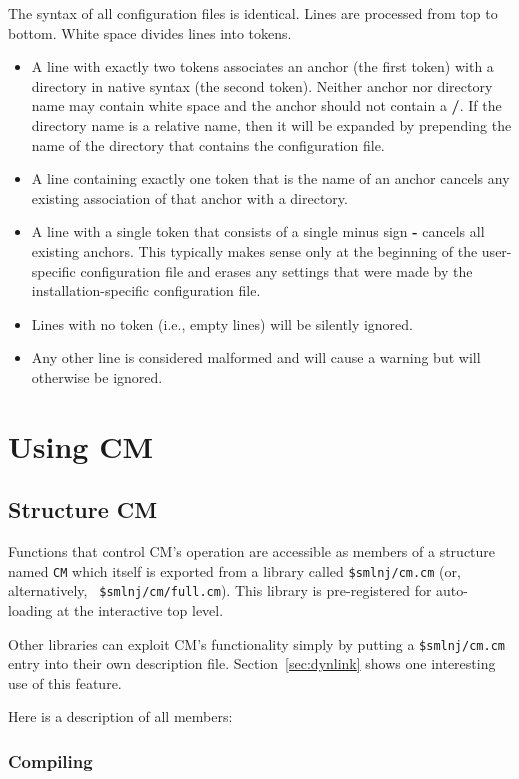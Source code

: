 \documentclass[titlepage,letterpaper]{article}
\begin{document}
The syntax of all configuration files is identical.  Lines are
processed from top to bottom. White space divides lines into tokens.
\begin{itemize}
\item A line with exactly two tokens associates an anchor (the first
token) with a directory in native syntax (the second token).  Neither
anchor nor directory name may contain white space and the anchor
should not contain a {\bf /}.  If the directory name is a relative
name, then it will be expanded by prepending the name of the directory
that contains the configuration file.
\item A line containing exactly one token that is the name of an
anchor cancels any existing association of that anchor with a
directory.
\item A line with a single token that consists of a single minus sign
{\bf -} cancels all existing anchors.  This typically makes sense only
at the beginning of the user-specific configuration file and
erases any settings that were made by the installation-specific
configuration file.
\item Lines with no token (i.e., empty lines) will be silently ignored.
\item Any other line is considered malformed and will cause a warning
but will otherwise be ignored.
\end{itemize}

\section{Using CM}

\subsection{Structure CM}
\label{sec:api}

Functions that control CM's operation are accessible as members of a
structure named {\tt CM} which itself is exported from a library
called {\tt \$smlnj/cm.cm} (or, alternatively, {\tt
\$smlnj/cm/full.cm}).  This library is pre-registered for auto-loading
at the interactive top level.

Other libraries can exploit CM's functionality simply by putting a
{\tt \$smlnj/cm.cm} entry into their own description file.
Section~\ref{sec:dynlink} shows one interesting use of this feature.

Here is a description of all members:

\subsubsection{Compiling}
\label{sec:api:compiling}
\end{document}
